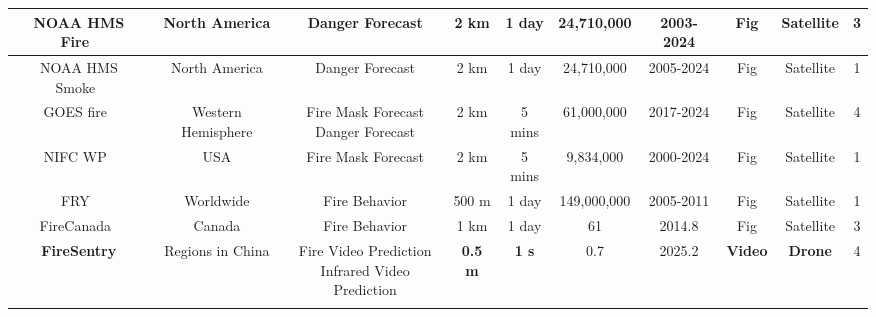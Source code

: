 \documentclass[11pt]{article}
\begin{document}
\begin{table}[htbp]
{\begin{tabular}{c|ccccccccc}
NOAA HMS Fire~ & North America & Danger Forecast & 2 km & 1 day & 24,710,000 & 2003-2024 &   Fig & Satellite & 3 \\ \hline
NOAA HMS Smoke~ & North America & Danger Forecast & 2 km & 1 day & 24,710,000 & 2005-2024 & Fig & Satellite & 1 \\ \hline
GOES fire~ & Western Hemisphere & \makecell{Fire Mask Forecast\\ Danger Forecast} & 2 km & 5 mins & 61,000,000 & 2017-2024 &   Fig & Satellite & 4 \\ \hline
NIFC WP~ & USA & Fire Mask Forecast & 2 km & 5 mins & 9,834,000 & 2000-2024 & Fig & Satellite & 1 \\ \hline
FRY~ & Worldwide & Fire Behavior & 500 m & 1 day & 149,000,000 & 2005-2011 & Fig & Satellite & 1 \\ \hline
FireCanada~ & Canada & Fire Behavior & 1 km & 1 day & 61 & 2014.8 &   Fig & Satellite & 3 \\ \Xhline{2\arrayrulewidth}
\textbf{FireSentry} & Regions in China & \makecell{Fire Video Prediction\\ Infrared Video Prediction} & \textbf{0.5 m} & \textbf{1 s} & 0.7 & 2025.2 & \textbf{Video} & \textbf{Drone} & 4 \\ 
\Xhline{2\arrayrulewidth} %
\end{tabular}
}
\end{table}
\end{document}
